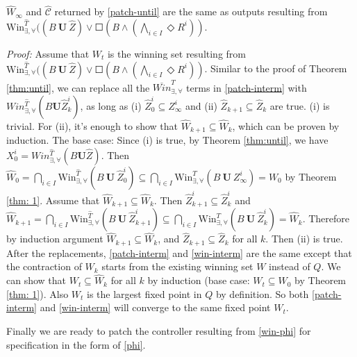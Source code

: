 \begin{theorem}
	$ \widehat{W}_\infty $ and $ \widehat{\mathcal{C}} $ returned by \eqref{patch-until} are the same as outputs resulting from $\text{Win}_{\exists,\forall}^{\widehat{T}}((B\mathbf{\ U\ }\widehat{Z})\vee \Square(B\wedge (\bigwedge_{i\in I} \Diamond R^i)) $. \label{thm:interm}	
\end{theorem}
\emph{Proof:} Assume that $ W_t $ is the winning set resulting from $\text{Win}_{\exists,\forall}^{\widehat{T}}((B\mathbf{\ U\ }\widehat{Z})\vee \Square(B\wedge (\bigwedge_{i\in I} \Diamond R^i)) $. Similar to the proof of Theorem \ref{thm:until}, we can replace all the $ \overline{Win}^{T}_{\exists,\forall} $ terms in \eqref{patch-interm} with $ Win^{\widehat{T}}_{\exists,\forall}(B\mathbf{U}\widehat{Z}_k^i) $, as long as (i) $ \widehat{Z}_0^i\subseteq Z_\infty^i $ and (ii) $ \widehat{Z}_{k+1} \subseteq \widehat{Z}_{k} $ are true. (i) is trivial. For (ii), it's enough to show that $ \widehat{W}_{k+1}\subseteq \widehat{W}_k $, which can be proven by induction. The base case: Since (i) is true, by Theorem \ref{thm:until}, we have $ X_0^i = Win_{\exists,\forall}^{\widehat{T}}(B\mathbf{U}\widehat{Z}) $. Then $ \widehat{W}_0 =\bigcap_{i\in I} \text{Win}_{\exists,\forall}^{\widehat{T}}(B\mathbf{\ U\ }\widehat{Z}_0^i)\subseteq \bigcap_{i\in I} \text{Win}_{\exists,\forall}^{T}(B\mathbf{\ U\ }Z_{\infty}^i) = W_0 $ by Theorem \ref{thm: 1}. Assume that $ \widehat{W}_{k+1} \subseteq \widehat{W}_k $.  Then $ \widehat{Z}_{k+1}^i\subseteq \widehat{Z}_{k}^i  $ and $ \widehat{W}_{k+1} =\bigcap_{i\in I} \text{Win}_{\exists,\forall}^{\widehat{T}}(B\mathbf{\ U\ }\widehat{Z}_{k+1}^i)\subseteq \bigcap_{i\in I} \text{Win}_{\exists,\forall}^{T}(B\mathbf{\ U\ }\widehat{Z}_{k}^i) = \widehat{W}_k $. Therefore by induction argument $ \widehat{W}_{k+1}\subseteq \widehat{W}_k $, and $ \widehat{Z}_{k+1}\subseteq \widehat{Z}_k $ for all $ k $. Then (ii) is true. After the replacements, \eqref{patch-interm} and \eqref{win-interm} are the same except that the contraction of $ W_k $ starts from the existing winning set $ W $ instead of $ Q $. We can show that $ W_t \subseteq \widehat{W}_k $ for all $ k $ by induction (base case: $ W_t \subseteq W_0$ by Theorem \ref{thm: 1}). Also $ W_t $ is the largest fixed point in $ Q $ by definition. So both \eqref{patch-interm} and \eqref{win-interm} will converge to the same fixed point $ W_t$.  \QEDB

Finally we are ready to patch the controller resulting from \eqref{win-phi} for specification in the form of \eqref{phi}.

